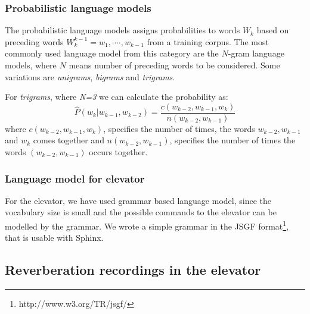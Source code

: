 \documentclass[a4paper, 12pt]{article}
\begin{document}
\subsubsection{Probabilistic language models}
\label{sec:prob_lang_model}
The probabilistic language models assigns probabilities to words $\textit{W}_k$ based on preceding words $\textit{W}_k^{k-1} = \textit{w}_1 , \cdots \cdot,\textit{w}_{k-1}$  from a training corpus. The most commonly used language model from this category are the $N$-gram language models, where $N$ means number of preceding words to be considered. Some variations are \textit{unigrams}, \textit{bigrams} and \textit{trigrams}. 

For \textit{trigrams}, where \textit{N=3} we can calculate the probability as:
\begin{equation}
  \hat{P}(w_k | w_{k-1},w_{k-2}) = \frac{c(w_{k-2},w_{k-1},w_k)}{n(w_{k-2},w_{k-1})} 
\end{equation}
where $c(w_{k-2},w_{k-1},w_k)$, specifies the number of times, the words $w_{k-2},w_{k-1}$ and $w_k$ comes together and $n(w_{k-2},w_{k-1})$, specifies the number of times the words $(w_{k-2},w_{k-1})$ occurs together. 

\subsubsection{Language model for elevator}
For the elevator, we have used grammar based language model, since the vocabulary size is small and the possible commands to the elevator can be modelled by the grammar. 
We wrote a simple grammar in the JSGF format\footnote{http://www.w3.org/TR/jsgf/}, that is usable with Sphinx.

\subsection{Reverberation recordings in the elevator}
\end{document}
